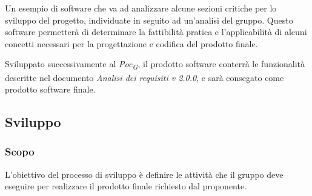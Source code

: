 Un esempio di software che va ad analizzare alcune sezioni critiche per lo sviluppo del progetto, individuate in seguito ad un'analisi del gruppo. Questo software permetterà di determinare la fattibilità pratica e l'applicabilità di alcuni concetti necessari per la progettazione e codifica del prodotto finale.

Sviluppato successivamente al \textit{Poc\textsubscript{G}}, il prodotto software conterrà le funzionalità descritte nel documento \textit{Analisi dei requisiti v 2.0.0}, e sarà consegato come prodotto software finale.

\subsection{Sviluppo}
    \subsubsection{Scopo}
    L'obiettivo del processo di sviluppo è definire le attività che il gruppo deve eseguire per realizzare il prodotto finale richiesto dal proponente.
